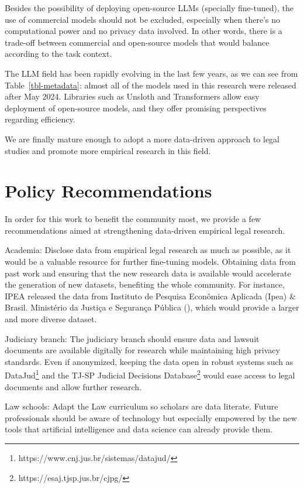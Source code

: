 \documentclass[
  12pt,
]{article}
\begin{document}
Besides the possibility of deploying open-source LLMs (specially
fine-tuned), the use of commercial models should not be excluded,
especially when there's no computational power and no privacy data
involved. In other words, there is a trade-off between commercial and
open-source models that would balance according to the task context.

The LLM field has been rapidly evolving in the last few years, as we can
see from Table~\ref{tbl-metadata}: almost all of the models used in this
research were released after May 2024. Libraries such as Unsloth and
Transformers allow easy deployment of open-source models, and they offer
promising perspectives regarding efficiency.

We are finally mature enough to adopt a more data-driven approach to
legal studies and promote more empirical research in this field.

\section{Policy Recommendations}\label{sec-policy-recommendations}

In order for this work to benefit the community most, we provide a few
recommendations aimed at strengthening data-driven empirical legal
research.

Academia: Disclose data from empirical legal research as much as
possible, as it would be a valuable resource for further fine-tuning
models. Obtaining data from past work and ensuring that the new research
data is available would accelerate the generation of new datasets,
benefiting the whole community. For instance, IPEA released the data
from Instituto de Pesquisa Econômica Aplicada (Ipea) \& Brasil.
Ministério da Justiça e Segurança Pública
(),
which would provide a larger and more diverse dataset.

Judiciary branch: The judiciary branch should ensure data and lawsuit
documents are available digitally for research while maintaining high
privacy standards. Even if anonymized, keeping the data open in robust
systems such as DataJud\footnote{https://www.cnj.jus.br/sistemas/datajud/}
and the TJ-SP Judicial Decisions Database\footnote{https://esaj.tjsp.jus.br/cjpg/}
would ease access to legal documents and allow further research.

Law schools: Adapt the Law curriculum so scholars are data literate.
Future professionals should be aware of technology but especially
empowered by the new tools that artificial intelligence and data science
can already provide them.
\end{document}
